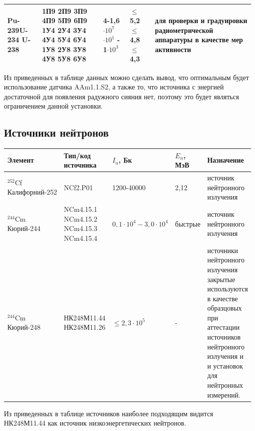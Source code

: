 \documentclass[11pt]{report}
\begin{document}
\begin{tabular}{|p{2.5cm}|p{2.7cm}|p{2.5cm}|p{1.5cm}|p{5cm}|}
	Pu-239\linebreak \linebreak \linebreak  U-234 \linebreak \linebreak \linebreak U-238 \linebreak & 1П9 2П9 3П9 4П9 5П9 6П9 \linebreak \linebreak 1У4 2У4 3У4 4У4 5У4 6У4 \linebreak \linebreak 1У8 2У8 3У8 4У8 5У8 6У8 \linebreak & 4-1,6$\cdot 10^7$ \linebreak \linebreak \linebreak 1$\cdot 10^1$ - 1$\cdot 10^3$ & $\leq $5,2 \linebreak \linebreak \linebreak $\leq $4,8 \linebreak \linebreak \linebreak $\leq $4,3 & для проверки и градуировки радиометрической аппаратуры в качестве мер активности\\
\hline
\end{tabular}

Из приведенных в таблице данных можно сделать вывод, что оптимальным будет использование датчика AAm1.1.S2, а также то, что источника с энергией достаточной для появления радужного сияния нет, поэтому это будет являться ограничением данной установки.

\subsection{Источники нейтронов}
\begin{tabular}{|p{3.5cm}|p{2.7cm}|p{2cm}|p{1.5cm}|p{4.5cm}|}
\hline
	Элемент & Тип/код источника & $I_n$, Бк & $E_n$, МэВ & Назначение\\
\hline
	$^{252}$Cf \linebreak Калифорний-252 & NCf2.P01 & 1200-40000 & 2,12 & источник нейтронного излучения \\
\hline
	$^{244}$Cm \linebreak Кюрий-244 & NCm4.15.1 NCm4.15.2 NCm4.15.3 NCm4.15.4 & $0,1\cdot 10^4 - 3,0\cdot 10^4$ & быстрые & источник нейтронного излучения \\
\hline
	$^{244}$Cm \linebreak Кюрий-248 & НК248М11.44 НК248М11.26  & $\leq 2,3\cdot 10^5$ & - & источники нейтронного излучения закрытые используются в качестве образцовых при аттестации источников нейтронного излучения и и установок для нейтронных измерений.\\
\hline
\end{tabular}
Из приведенных в таблице источников наиболее подходящим видится НК248М11.44 как источник низкоэнергетических нейтронов.
\end{document}
